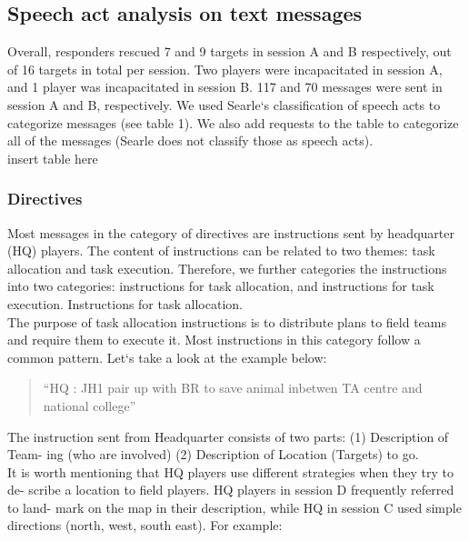 \subsection{Speech act analysis on text messages}
Overall, responders rescued 7 and 9 targets in session A and B respectively, out of 16 targets in total per session. Two players were incapacitated in session A, and 1 player was incapacitated in session B. 117 and 70 messages were sent in session A and B, respectively. We used Searle`s classification of speech acts to categorize messages (see table 1). We also add requests to the table to categorize all of the messages (Searle does not classify those as speech acts).\\

insert table here\\

\subsubsection{Directives}

Most messages in the category of directives are instructions sent by headquarter (HQ) players. The content of instructions can be related to two themes: task allocation and task execution. Therefore, we further categories the instructions into two categories: instructions for task allocation, and instructions for task execution.
Instructions for task allocation.\\

The purpose of task allocation instructions is to distribute plans to field teams and require them to execute it. Most instructions in this category follow a common pattern. Let`s take a look at the example below:

\begin{quote}
``HQ : JH1 pair up with BR to save animal inbetwen TA centre and national college''\\
\end{quote}

The instruction sent from Headquarter consists of two parts: (1) Description of Team- ing (who are involved) (2) Description of Location (Targets) to go.\\

It is worth mentioning that HQ players use different strategies when they try to de- scribe a location to field players. HQ players in session D frequently referred to land- mark on the map in their description, while HQ in session C used simple directions (north, west, south east). For example:\\

